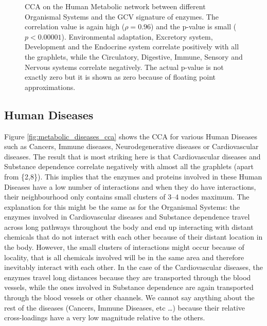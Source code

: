 \begin{figure}
\begin{subfigure}{.65\textwidth}
  \end{subfigure}
  \begin{subfigure}{.25\textwidth}
    \centering 
	
    \gtwentysix
    \gtwentyfour
    \gtwentythree
    \gdots
    \gtwo
    \gtwentytwo
    \gfifteen

  \end{subfigure}
  
\caption[CCA on the Human Metabolic network between different Organismal Systems and the GCV signature of enzymes.]{CCA on the Human Metabolic network between different Organismal Systems and the GCV signature of enzymes. The correlation value is again high ($\rho = 0.96$) and the p-value is small ($p < 0.00001$). Environmental adaptation, Excretory system, Development and the Endocrine system correlate positively with all the graphlets, while the Circulatory, Digestive, Immune, Sensory and Nervous systems correlate negatively. The actual p-value is not exactly zero but it is shown as zero because of floating point approximations.}
\label{organismal_cca}
\end{figure}




\subsection{Human Diseases}
\label{cca_kegg_human}

Figure \ref{fig:metabolic_diseases_cca} shows the CCA for various Human Diseases such as Cancers, Immune diseases, Neurodegenerative diseases or Cardiovascular diseases. The result that is most striking here is that Cardiovascular diseases and Substance dependence correlate negatively with almost all the graphlets (apart from \{2,8\}). This implies that the enzymes and proteins involved in these Human Diseases have a low number of interactions and when they do have interactions, their neighbourhood only contains small clusters of 3--4 nodes maximum. The explanation for this might be the same as for the Organismal Systems: the enzymes involved in Cardiovascular diseases and Substance dependence travel across long pathways throughout the body and end up interacting with distant chemicals that do not interact with each other because of their distant location in the body. However, the small clusters of interactions might occur because of locality, that is all chemicals involved will be in the same area and 
therefore inevitably interact with each other. In the case of the Cardiovascular diseases, the enzymes travel long distances because they are transported through the blood vessels, while the ones involved in Substance dependence are again transported through the blood vessels or other channels. We cannot say anything about the rest of the diseases (Cancers, Immune Diseases, etc \dots) because their relative cross-loadings have a very low magnitude relative to the others.


